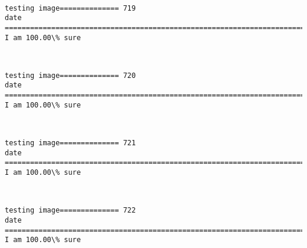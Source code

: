 \documentclass[11pt]{article}
\begin{document}
    \begin{center}
    \end{center}
    { \hspace*{\fill} \\}
    
    \begin{Verbatim}[commandchars=\\\{\}]
testing image============== 719
date
============================================================================
I am 100.00\% sure

    \end{Verbatim}

    \begin{center}
    \end{center}
    { \hspace*{\fill} \\}
    
    \begin{Verbatim}[commandchars=\\\{\}]
testing image============== 720
date
============================================================================
I am 100.00\% sure

    \end{Verbatim}

    \begin{center}
    \end{center}
    { \hspace*{\fill} \\}
    
    \begin{Verbatim}[commandchars=\\\{\}]
testing image============== 721
date
============================================================================
I am 100.00\% sure

    \end{Verbatim}

    \begin{center}
    \end{center}
    { \hspace*{\fill} \\}
    
    \begin{Verbatim}[commandchars=\\\{\}]
testing image============== 722
date
============================================================================
I am 100.00\% sure

    \end{Verbatim}
\end{document}
